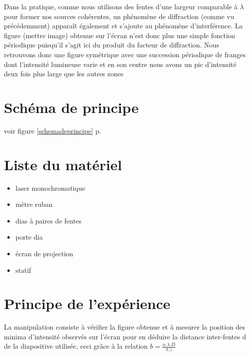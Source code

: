 \documentclass[11pt,a4paper]{report}
\begin{document}
Dans la pratique, comme nous utilisons des fentes d'une largeur comparable à $\lambda$ pour former nos sources cohérentes, un phénomène de diffraction (comme vu précédemment) apparaît également et s'ajoute au phénomène d'interférence. La figure (mettre image) obtenue sur l'écran n'est donc plus une simple fonction périodique puisqu'il s'agit ici du produit du facteur de diffraction. Nous retrouvons donc une figure symétrique avec une succession périodique de franges dont l’intensité lumineuse varie et en son centre nous avons un pic d'intensité deux fois plus large que les autres zones

	\section{Schéma de principe}
	voir figure \ref{schemadeprincipe} p.\pageref{schemadeprincipe}
	\section{Liste du matériel}
	\begin{itemize}
	\item laser monochromatique
	\item mètre ruban
	\item dias à paires de fentes
	\item porte dia
	\item écran de projection
	\item statif
	\end{itemize}
	\section{Principe de l'expérience}
	La manipulation consiste à vérifier la figure obtenue et à mesurer la position des minima d'intensité observés sur l'écran pour en déduire la distance inter-fentes d de la diapositive utilisée, ceci grâce à la relation $b = \frac{\alpha .\lambda.D }{\pi.z}$
\end{document}
